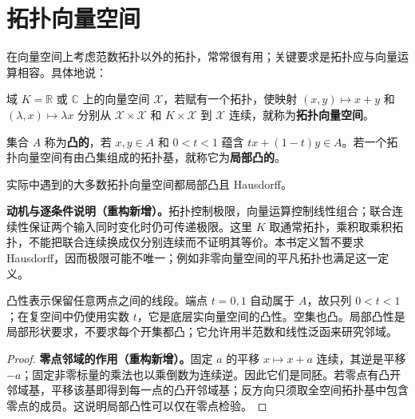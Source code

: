 \documentclass[../../main.tex]{subfiles}
\begin{document}
\section{拓扑向量空间}\label{section:ch05-topological-vector-spaces}
在向量空间上考虑范数拓扑以外的拓扑，常常很有用；关键要求是拓扑应与向量运算相容。具体地说：
\begin{definition}[拓扑向量空间]\label{definition:ch05-topological-vector-space}
域 $K=\mathbb R$ 或 $\mathbb C$ 上的向量空间 $\mathcal X$，若赋有一个拓扑，使映射 $(x,y)\mapsto x+y$ 和 $(\lambda,x)\mapsto\lambda x$ 分别从 $\mathcal X\times\mathcal X$ 和 $K\times\mathcal X$ 到 $\mathcal X$ 连续，就称为\textbf{拓扑向量空间}。
\end{definition}
\begin{definition}[凸集与局部凸空间]\label{definition:ch05-locally-convex}
集合 $A$ 称为\textbf{凸的}，若 $x,y\in A$ 和 $0<t<1$ 蕴含 $tx+(1-t)y\in A$。若一个拓扑向量空间有由凸集组成的拓扑基，就称它为\textbf{局部凸的}。
\end{definition}
实际中遇到的大多数拓扑向量空间都局部凸且 Hausdorff。
\begin{remark}
\textbf{动机与逐条件说明（重构新增）。}拓扑控制极限，向量运算控制线性组合；联合连续性保证两个输入同时变化时仍可传递极限。这里 $K$ 取通常拓扑，乘积取乘积拓扑，不能把联合连续换成仅分别连续而不证明其等价。本书定义暂不要求 Hausdorff，因而极限可能不唯一；例如非零向量空间的平凡拓扑也满足这一定义。

凸性表示保留任意两点之间的线段。端点 $t=0,1$ 自动属于 $A$，故只列 $0<t<1$；在复空间中仍使用实数 $t$，它是底层实向量空间的凸性。空集也凸。局部凸性是局部形状要求，不要求每个开集都凸；它允许用半范数和线性泛函来研究邻域。
\end{remark}
\begin{proof}
\textbf{零点邻域的作用（重构新增）。}固定 $a$ 的平移 $x\mapsto x+a$ 连续，其逆是平移 $-a$；固定非零标量的乘法也以乘倒数为连续逆。因此它们是同胚。若零点有凸开邻域基，平移该基即得到每一点的凸开邻域基；反方向只须取全空间拓扑基中包含零点的成员。这说明局部凸性可以仅在零点检验。
\end{proof}
\end{document}
